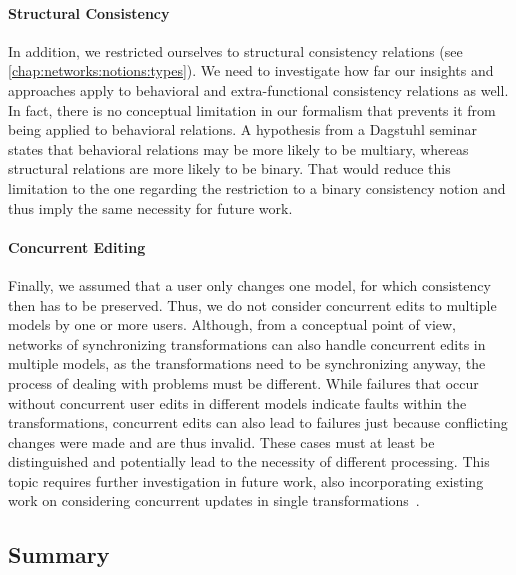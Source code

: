 \paragraph{Structural Consistency}
In addition, we restricted ourselves to structural consistency relations (see \autoref{chap:networks:notions:types}).
We need to investigate how far our insights and approaches apply to behavioral and extra-functional consistency relations as well.
In fact, there is no conceptual limitation in our formalism that prevents it from being applied to behavioral relations.
A hypothesis from a Dagstuhl seminar~\cite{cleve2019dagstuhl} states that behavioral relations may be more likely to be multiary, whereas structural relations are more likely to be binary.
That would reduce this limitation to the one regarding the restriction to a binary consistency notion and thus imply the same necessity for future work.

\paragraph{Concurrent Editing}
Finally, we assumed that a user only changes one model, for which consistency then has to be preserved.
Thus, we do not consider concurrent edits to multiple models by one or more users.
Although, from a conceptual point of view, networks of synchronizing transformations can also handle concurrent edits in multiple models, as the transformations need to be synchronizing anyway, the process of dealing with problems must be different.
While failures that occur without concurrent user edits in different models indicate faults within the transformations, concurrent edits can also lead to failures just because conflicting changes were made and are thus invalid.
These cases must at least be distinguished and potentially lead to the necessity of different processing.
This topic requires further investigation in future work, also incorporating existing work on considering concurrent updates in single transformations~\cite{xiong2009parallelUpdates-ICMT,xiong2013SynchronizingConcurrentUpdates-SoSym}.


\subsection{Summary}

